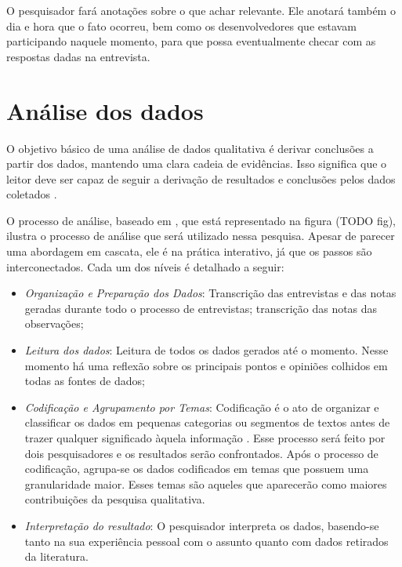 O pesquisador fará anotações sobre o que achar relevante. Ele anotará também o 
dia e hora que o fato ocorreu, bem como os desenvolvedores que estavam
participando naquele momento, para que possa eventualmente checar com as
respostas dadas na entrevista.

\section{Análise dos dados}
\label{sec:planejamento-analise}

O objetivo básico de uma análise de dados qualitativa é derivar conclusões a
partir dos dados, mantendo uma clara cadeia de evidências. Isso significa que  o
leitor deve ser capaz de seguir a derivação de resultados e conclusões pelos 
dados coletados \cite{yin}.

O processo de análise, baseado em \cite{creswell}, que está representado na
figura (TODO fig), ilustra o processo de análise que será utilizado nessa
pesquisa. Apesar de parecer uma abordagem em cascata, ele é na prática 
interativo, já que os passos são interconectados. Cada um dos níveis é 
detalhado a seguir:

\begin{itemize}

	\item \textit{Organização e Preparação dos Dados}: Transcrição das entrevistas 
	e das notas geradas durante todo o processo de entrevistas; transcrição das
	notas das observações;
	
	\item \textit{Leitura dos dados}: Leitura de todos os dados gerados até o
	momento. Nesse momento há uma reflexão sobre os principais pontos e opiniões 
	colhidos em todas as fontes de dados;
	
	\item \textit{Codificação e Agrupamento por Temas}:	Codificação é o ato de
	organizar e classificar os dados em pequenas categorias ou segmentos de textos 
	antes de trazer qualquer significado àquela informação \cite{rossman}. Esse 
	processo será feito por dois pesquisadores e os resultados serão confrontados. 
	Após o processo de codificação, agrupa-se os dados codificados em temas que 
	possuem uma granularidade maior. Esses temas são aqueles que aparecerão como 
	maiores contribuições da pesquisa qualitativa.
	
	\item \textit{Interpretação do resultado}: O pesquisador interpreta os dados, 
	basendo-se tanto na sua experiência pessoal com o assunto quanto com dados 
	retirados da literatura.

\end{itemize}
 
